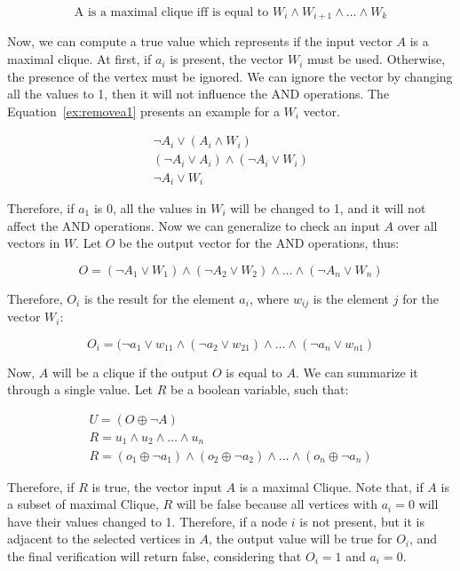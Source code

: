 \documentclass[a4paper,12pt]{article}
\begin{document}
\begin{equation}
	\text{A is a maximal clique iff is equal to } W_i \land W_{i+1} \land \dots \land W_k
\end{equation}

Now, we can compute a true value which represents if the input vector $A$ is a maximal clique. At first, if $a_i$ is present, the vector $W_i$ must be used. Otherwise, the presence of the vertex must be ignored. We can ignore the vector by changing all the values to 1, then it will not influence the AND operations. The Equation~\ref{ex:removea1} presents an example for a $W_i$ vector. 

\begin{align}
	\neg A_i \lor (A_i \land W_i) \\
	(\neg A_i \lor A_i) \land (\neg A_i \lor W_i) \\
	\neg A_i \lor W_i \label{ex:removea1}
\end{align}

Therefore, if $a_1$ is 0, all the values in $W_i$ will be changed to 1, and it will not affect the AND operations. Now we can generalize to check an input $A$ over all vectors in $W$. Let $O$ be the output vector for the AND operations, thus:

\begin{equation}
	O = (\neg A_1 \lor W_1) \land (\neg A_2 \lor W_2) \land \dots \land (\neg A_n \lor W_n)
\end{equation}

Therefore, $O_i$ is the result for the element $a_i$, where $w_{ij}$ is the element $j$ for the vector $W_i$:

\begin{equation}
O_i = (\neg a_1 \lor w_{11} \land (\neg a_2 \lor w_{21}) \land \dots \land (\neg a_n \lor w_{n1})
\end{equation}

Now, $A$ will be a clique if the output $O$ is equal to $A$. We can summarize it through a single value. Let $R$ be a boolean variable, such that:

\begin{align}
	U = (O \oplus \neg A)\\
	R = u_1 \land u_2 \land \dots \land u_n\\
	R = (o_1 \oplus \neg a_1) \land (o_2 \oplus \neg a_2) \land \dots \land (o_n \oplus \neg a_n)
\end{align}

Therefore, if $R$ is true, the vector input $A$ is a maximal Clique. Note that, if $A$ is a subset of maximal Clique, $R$ will be false because all vertices with $a_i = 0$ will have their values changed to 1. Therefore, if a node $i$ is not present, but it is adjacent to the selected vertices in $A$, the output value will be true for $O_i$, and the final verification will return false, considering that $O_i = 1$ and $a_i = 0$.
\end{document}

